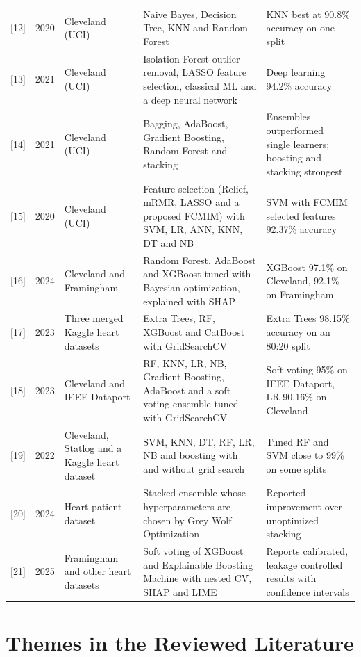 \documentclass[12pt,a4paper,oneside]{report}
\begin{document}
\begin{table}[htbp]
\begin{tabular}
{}[12] & 2020 & Cleveland (UCI) & Naive Bayes, Decision Tree, KNN and Random Forest & KNN best at 90.8\% accuracy on one split \\
{}[13] & 2021 & Cleveland (UCI) & Isolation Forest outlier removal, LASSO feature selection, classical ML and a deep neural network & Deep learning 94.2\% accuracy \\
{}[14] & 2021 & Cleveland (UCI) & Bagging, AdaBoost, Gradient Boosting, Random Forest and stacking & Ensembles outperformed single learners; boosting and stacking strongest \\
{}[15] & 2020 & Cleveland (UCI) & Feature selection (Relief, mRMR, LASSO and a proposed FCMIM) with SVM, LR, ANN, KNN, DT and NB & SVM with FCMIM selected features 92.37\% accuracy \\
{}[16] & 2024 & Cleveland and Framingham & Random Forest, AdaBoost and XGBoost tuned with Bayesian optimization, explained with SHAP & XGBoost 97.1\% on Cleveland, 92.1\% on Framingham \\
{}[17] & 2023 & Three merged Kaggle heart datasets & Extra Trees, RF, XGBoost and CatBoost with GridSearchCV & Extra Trees 98.15\% accuracy on an 80:20 split \\
{}[18] & 2023 & Cleveland and IEEE Dataport & RF, KNN, LR, NB, Gradient Boosting, AdaBoost and a soft voting ensemble tuned with GridSearchCV & Soft voting 95\% on IEEE Dataport, LR 90.16\% on Cleveland \\
{}[19] & 2022 & Cleveland, Statlog and a Kaggle heart dataset & SVM, KNN, DT, RF, LR, NB and boosting with and without grid search & Tuned RF and SVM close to 99\% on some splits \\
{}[20] & 2024 & Heart patient dataset & Stacked ensemble whose hyperparameters are chosen by Grey Wolf Optimization & Reported improvement over unoptimized stacking \\
{}[21] & 2025 & Framingham and other heart datasets & Soft voting of XGBoost and Explainable Boosting Machine with nested CV, SHAP and LIME & Reports calibrated, leakage controlled results with confidence intervals \\
\hline
\end{tabular}
\end{table}

\section{Themes in the Reviewed Literature}
\end{document}
